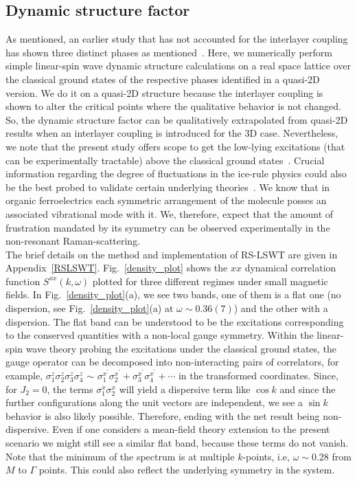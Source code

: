 \subsection{Dynamic structure factor}
\label{dynamic}
\indent \indent As mentioned, an earlier study that has not accounted for the interlayer coupling has shown three distinct phases as mentioned~\cite{ishizuka2011quantum,vijigiri2020dipole}. Here, we numerically perform simple linear-spin wave dynamic structure calculations on a real space lattice over the classical ground states of the respective phases identified in a quasi-2D version. We do it on a quasi-2D structure because the interlayer coupling is shown to alter the critical points where the qualitative behavior is not changed. So, the dynamic structure factor can be qualitatively extrapolated from quasi-2D results when an interlayer coupling is introduced for the 3D case. Nevertheless, we note that the present study offers scope to get the low-lying excitations (that can be experimentally tractable) above the classical ground states~\cite{vijigiri2018classical}. Crucial information regarding the degree of fluctuations in the ice-rule physics could also be the best probed to validate certain underlying theories~\cite{chern2014gauge}. We know that in organic ferroelectrics each symmetric arrangement of the molecule posses an associated vibrational mode with it. We, therefore, expect that the amount of frustration mandated by its symmetry can be observed experimentally in the non-resonant Raman-scattering. \\
\indent The brief details on the method and implementation of RS-LSWT are given in Appendix~\ref{RSLSWT}. Fig.~\ref{density_plot} shows the $xx$ dynamical correlation function $S^{xx}(k,\omega)$ plotted for three different regimes under small magnetic fields. In Fig.~\ref{density_plot}(a), we see two bands, one of them is a flat one (no dispersion, see Fig.~\ref{density_plot}(a) at $\omega\sim 0.36(7)$) and the other with a dispersion. The flat band can be understood to be the excitations corresponding to the conserved quantities with a non-local gauge symmetry. Within the linear-spin wave theory probing the excitations under the classical ground states, the gauge operator can be decomposed into non-interacting pairs of correlators, for example, $\sigma^z_1\sigma^z_2\sigma^z_3\sigma^z_4$ $\sim $ $\sigma^{x^\prime}_1\sigma^{x^\prime}_2+\sigma^{x^\prime}_3\sigma^{x^\prime}_4+\cdots$ in the transformed coordinates. Since, for $J_2=0$, the terms $\sigma^x_1\sigma^x_2$ will yield a dispersive term like $\cos k$ and since the further configurations along the unit vectors are independent, we see a $\sin k$ behavior is also likely possible. Therefore, ending with the net result being non-dispersive. Even if one considers a mean-field theory extension to the present scenario we might still see a similar flat band, because these terms do not vanish. Note that the minimum of the spectrum is at multiple $k$-points, i.e, $\omega\sim 0.28$ from $M$ to $\Gamma$ points. This could also reflect the underlying symmetry in the system.\\
